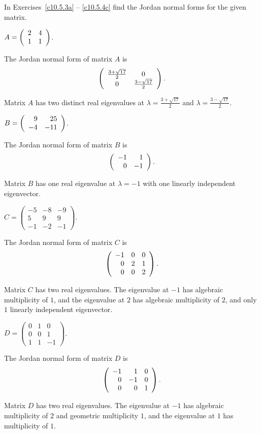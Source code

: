\documentclass{ximera}
\begin{document}
\noindent In Exercises~\ref{c10.5.3a} -- \ref{c10.5.4c} find the 
Jordan normal forms for the given matrix.
\begin{exercise} \label{c10.5.3a}
$A = \left(\begin{array}{rr} 2 & 4\\ 1 &1\end{array}\right)$. 

\begin{solution}

\ans The Jordan normal form of matrix $A$ is
\[
\left(\begin{array}{cc} \frac{3 + \sqrt{17}}{2} & 0\\ 0 &\frac{3 - \sqrt{17}}{2}\end{array}\right).
\]

\soln Matrix $A$ has two distinct real eigenvalues at
$\lambda = \frac{3 + \sqrt{17}}{2}$ and 
$\lambda = \frac{3 - \sqrt{17}}{2}$.

\end{solution}
\end{exercise}
\begin{exercise} \label{c10.5.3b}
$B = \left(\begin{array}{rr} 9 & 25\\ -4 &-11\end{array}\right)$.

\begin{solution}

\ans The Jordan normal form of matrix $B$ is
\[
\left(\begin{array}{rr} -1 & 1\\ 0 &-1\end{array}\right).
\]

\soln Matrix $B$ has one real eigenvalue at $\lambda = -1$ with one
linearly independent eigenvector.

\end{solution}
\end{exercise}
\begin{exercise} \label{c10.5.4}
$C = \left(\begin{array}{rrr} -5 & -8 & -9 \\  5 & 9 & 9 \\
 -1 & -2 & -1 \end{array}\right)$.

\begin{solution}

\ans The Jordan normal form of matrix $C$ is
\[
\left(\begin{array}{rrr} -1 & 0 & 0 \\ 0 & 2 & 1 \\ 0 & 0 & 2\end{array}\right).
\]

\soln Matrix $C$ has two real eigenvalues.  The eigenvalue at $-1$ has
algebraic multiplicity of $1$, and the eigenvalue at $2$ has algebraic
multiplicity of $2$, and only $1$ linearly independent eigenvector.


\end{solution}
\end{exercise}
\begin{exercise} \label{c10.5.4a}
$D = \left(\begin{array}{rrr} 0 & 1 & 0 \\  0 & 0 & 1 \\
1 & 1 & -1 \end{array}\right)$.

\begin{solution}
\ans The Jordan normal form of matrix $D$ is
\[
\left(\begin{array}{rrr} -1 & 1 & 0 \\ 0 & -1 & 0 \\ 0 & 0 & 1\end{array}\right).
\]

\soln Matrix $D$ has two real eigenvalues.  The eigenvalue at $-1$ has
algebraic multiplicity of $2$ and geometric multiplicity $1$, and the eigenvalue at 
$1$ has multiplicity of $1$.

\end{solution}
\end{exercise}
\end{document}

